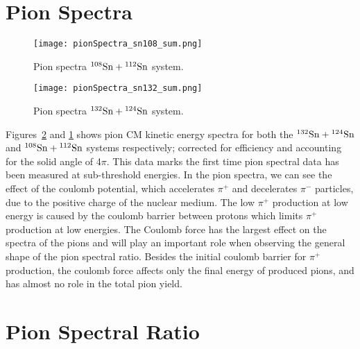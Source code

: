 \section{Pion Spectra}
\label{sec:pionSpectra}


\begin{comment}
\begin{figure}[!htb]
\centering
\texttt{[image: pionSpectra.png]}
\caption{Pion spectra. }
\label{fig:pionspectra}
\end{figure}
\end{comment}

\begin{figure}[!htb]
\centering
\texttt{[image: pionSpectra\_sn108\_sum.png]}
\caption{Pion spectra ${}^{108}\mathrm{Sn} + {}^{112}\mathrm{Sn}$ system. }
\label{fig:pionspectraSn108}
\end{figure}


\begin{figure}[!htb]
\centering
\texttt{[image: pionSpectra\_sn132\_sum.png]}
\caption{Pion spectra ${}^{132}\mathrm{Sn} + {}^{124}\mathrm{Sn}$ system. }
\label{fig:pionspectraSn132}
\end{figure}


Figures~\ref{fig:pionspectraSn132} and \ref{fig:pionspectraSn108} shows pion CM kinetic energy spectra for both the ${}^{132}\mathrm{Sn} + {}^{124}\mathrm{Sn}$ and ${}^{108}\mathrm{Sn} + {}^{112}\mathrm{Sn}$ systems respectively; corrected for efficiency and accounting for the solid angle of 4$\pi$. This data marks the first time pion spectral data has been measured at sub-threshold energies. In the pion spectra, we can see the effect of the coulomb potential, which accelerates $\pi^+$ and decelerates $\pi^-$ particles, due to the positive charge of the nuclear medium. The low $\pi^+$ production at low energy is caused by the coulomb barrier between protons which limits $\pi^+$ production at low energies. The Coulomb force has the largest effect on the spectra of the pions and will play an important role when observing the general shape of the pion spectral ratio. Besides the initial coulomb barrier for $\pi^+$ production, the coulomb force affects only the final energy of produced pions, and has almost no role in the total pion yield. 




\section{Pion Spectral Ratio}


